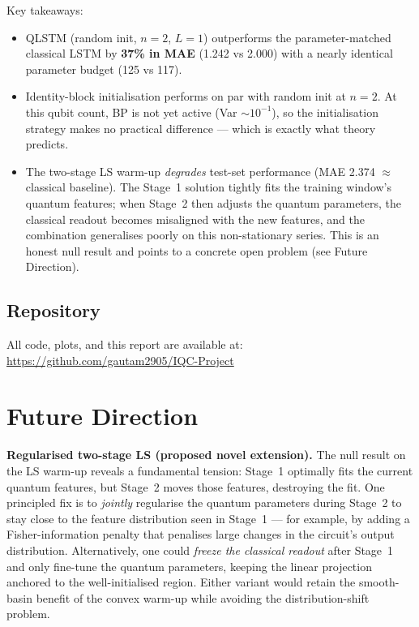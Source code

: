 \documentclass[10pt,twocolumn]{article}
\begin{document}
Key takeaways:

\begin{itemize}
  \item QLSTM (random init, $n{=}2$, $L{=}1$) outperforms the parameter-matched classical LSTM by \textbf{37\% in MAE} (1.242 vs 2.000) with a nearly identical parameter budget (125 vs 117).
  \item Identity-block initialisation performs on par with random init at $n{=}2$. At this qubit count, BP is not yet active (Var $\sim 10^{-1}$), so the initialisation strategy makes no practical difference — which is exactly what theory predicts.
  \item The two-stage LS warm-up \emph{degrades} test-set performance (MAE 2.374 $\approx$ classical baseline). The Stage~1 solution tightly fits the training window's quantum features; when Stage~2 then adjusts the quantum parameters, the classical readout becomes misaligned with the new features, and the combination generalises poorly on this non-stationary series. This is an honest null result and points to a concrete open problem (see Future Direction).
\end{itemize}

\subsection*{Repository}

All code, plots, and this report are available at:\\
\url{https://github.com/gautam2905/IQC-Project}


\section{Future Direction}

\textbf{Regularised two-stage LS (proposed novel extension).} The null result on the LS warm-up reveals a fundamental tension: Stage~1 optimally fits the current quantum features, but Stage~2 moves those features, destroying the fit. One principled fix is to \emph{jointly} regularise the quantum parameters during Stage~2 to stay close to the feature distribution seen in Stage~1 — for example, by adding a Fisher-information penalty that penalises large changes in the circuit's output distribution. Alternatively, one could \emph{freeze the classical readout} after Stage~1 and only fine-tune the quantum parameters, keeping the linear projection anchored to the well-initialised region. Either variant would retain the smooth-basin benefit of the convex warm-up while avoiding the distribution-shift problem.
\end{document}
